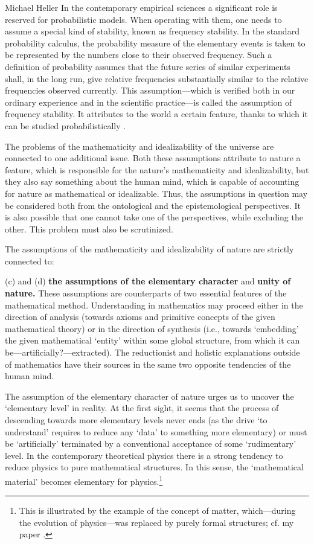 \begin{artengenv}{Michael Heller}
In the contemporary empirical sciences a significant role is reserved for probabilistic models. When operating with
them, one needs to assume a special kind of stability, known as frequency stability. In the standard probability
calculus, the probability measure of the elementary events is taken to be represented by the numbers close to their
observed frequency. Such a definition of probability assumes that the future series of similar experiments shall, in
the long run, give relative frequencies substantially similar to the relative frequencies observed currently. This 
assumption---which is verified both in our ordinary experience and in the scientific practice---is called the assumption of
frequency stability. It attributes to the world a certain feature, thanks to which it can be studied probabilistically
\parencite[cf.][]{heller_kilka_1985}.

The problems of the mathematicity and idealizability of the universe are connected to one additional issue. Both
these assumptions attribute to nature a feature, which is responsible for the nature's mathematicity and
idealizability, but they also say something about the human mind, which is capable of accounting for nature as
mathematical or idealizable. Thus, the assumptions in question may be considered both from the ontological and the
epistemological perspectives. It is also possible that one cannot take one of the perspectives, while excluding the
other. This problem must also be scrutinized.

The assumptions of the mathematicity and idealizability of nature are strictly connected to:

(c) and (d) \textbf{the assumptions of the elementary character }and\textbf{ unity of nature.} These assumptions are
counterparts of two essential features of the mathematical method. Understanding in mathematics may proceed either in
the direction of analysis (towards axioms and primitive concepts of the given mathematical theory) or in the direction
of synthesis (i.e., towards `embedding' the given mathematical `entity' within some global structure, from which it can
be---artificially?---extracted). The reductionist and holistic explanations outside of mathematics have their sources in
the same two opposite tendencies of the human mind.

The assumption of the elementary character of nature urges us to uncover the `elementary level' in reality. At the
first sight, it seems that the process of descending towards more elementary levels never ends (as the drive `to
understand' requires to reduce any `data' to something more elementary) or must be `artificially' terminated by a
conventional acceptance of some `rudimentary' level. In the contemporary theoretical physics there is a strong tendency
to reduce physics to pure mathematical structures. In this sense, the `mathematical material' becomes elementary for
physics.\footnote{This is illustrated by the example of the concept of matter, which---during the evolution of
physics---was replaced by purely formal structures; cf. my paper
\parencite{heller_ewolucja_1982}.
}


\end{artengenv}
